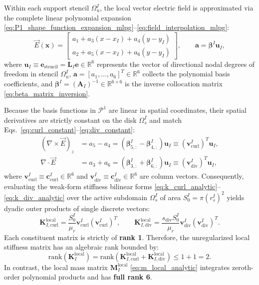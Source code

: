 \documentclass[VANCOUVER,Times1COL]{WileyNJD-v5}
\begin{document}
Within each support stencil $\Omega_u^I$, the local vector electric field is approximated via the complete linear polynomial expansion \eqref{eq:P1_shape_function_expansion_mlpg}--\eqref{eq:field_interpolation_mlpg}:
\begin{equation}
    \vec{E}(\mathbf{x}) = \begin{bmatrix} a_1 + a_3 (x - x_I) + a_4 (y - y_I) \\ a_2 + a_5 (x - x_I) + a_6 (y - y_I) \end{bmatrix}, \qquad \mathbf{a} = \boldsymbol{\beta}^I \mathbf{u}_I,
    \label{eq:p1_field_vector_expanded}
\end{equation}
where $\mathbf{u}_I \equiv \mathbf{e}_{\mathrm{stencil}} = \mathbf{L}_I \mathbf{e} \in \mathbb{R}^6$ represents the vector of directional nodal degrees of freedom in stencil $\Omega_u^I$, $\mathbf{a} = [a_1, \dots, a_6]^T \in \mathbb{R}^6$ collects the polynomial basis coefficients, and $\boldsymbol{\beta}^I = (\mathbf{A}_I)^{-1} \in \mathbb{R}^{6 \times 6}$ is the inverse collocation matrix \eqref{eq:beta_matrix_inversion}.

Because the basis functions in $\mathcal{P}^1$ are linear in spatial coordinates, their spatial derivatives are strictly constant on the disk $\Omega_s^I$ and match Eqs.~\eqref{eq:curl_constant}--\eqref{eq:div_constant}:
\begin{align}
    (\nabla \times \vec{E})_z & = a_5 - a_4 = (\boldsymbol{\beta}_{5, :}^I - \boldsymbol{\beta}_{4, :}^I) \mathbf{u}_I \equiv (\mathbf{v}_{\mathrm{curl}}^I)^T \mathbf{u}_I, \\
    \nabla \cdot \vec{E}      & = a_3 + a_6 = (\boldsymbol{\beta}_{3, :}^I + \boldsymbol{\beta}_{6, :}^I) \mathbf{u}_I \equiv (\mathbf{v}_{\mathrm{div}}^I)^T \mathbf{u}_I,
\end{align}
where $\mathbf{v}_{\mathrm{curl}}^I \equiv \mathbf{c}_{\mathrm{curl}}^I \in \mathbb{R}^6$ and $\mathbf{v}_{\mathrm{div}}^I \equiv \mathbf{c}_{\mathrm{div}}^I \in \mathbb{R}^6$ are column vectors.
Consequently, evaluating the weak-form stiffness bilinear forms \eqref{eq:k_curl_analytic}--\eqref{eq:k_div_analytic} over the active subdomain $\Omega_s^I$ of area $S_0^I = \pi (r_s^I)^2$ yields dyadic outer products of single discrete vectors:
\begin{equation}
    \mathbf{K}_{I, \mathrm{curl}}^{\mathrm{local}} = \frac{S_0^I}{\mu_r} \mathbf{v}_{\mathrm{curl}}^I (\mathbf{v}_{\mathrm{curl}}^I)^T, \qquad
    \mathbf{K}_{I, \mathrm{div}}^{\mathrm{local}} = \frac{s_{\mathrm{div}} S_0^I}{\mu_r} \mathbf{v}_{\mathrm{div}}^I (\mathbf{v}_{\mathrm{div}}^I)^T.
\end{equation}
Each constituent matrix is strictly of \textbf{rank 1}. Therefore, the unregularized local stiffness matrix has an algebraic rank bounded by:
\begin{equation}
    \mathrm{rank}(\mathbf{K}_I^{\mathrm{local}}) = \mathrm{rank}\left(\mathbf{K}_{I, \mathrm{curl}}^{\mathrm{local}} + \mathbf{K}_{I, \mathrm{div}}^{\mathrm{local}}\right) \le 1 + 1 = 2.
    \label{eq:stiffness_rank_deficiency}
\end{equation}
In contrast, the local mass matrix $\mathbf{M}_I^{\mathrm{local}}$ \eqref{eq:m_local_analytic} integrates zeroth-order polynomial products and has \textbf{full rank 6}.
\end{document}
